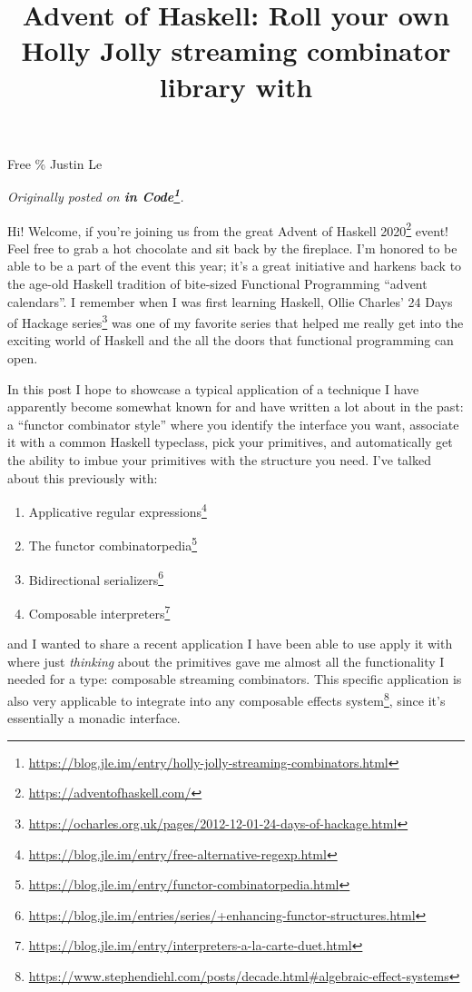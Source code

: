 \documentclass[]{article}
\title{Advent of Haskell: Roll your own Holly Jolly streaming combinator library with}
\renewcommand{\href}[2]{#2\footnote{\url{#1}}}
\begin{document}
\maketitle

Free \% Justin Le

\emph{Originally posted on
\textbf{\href{https://blog.jle.im/entry/holly-jolly-streaming-combinators.html}{in
Code}}.}

Hi! Welcome, if you're joining us from the great
\href{https://adventofhaskell.com/}{Advent of Haskell 2020} event! Feel free to
grab a hot chocolate and sit back by the fireplace. I'm honored to be able to be
a part of the event this year; it's a great initiative and harkens back to the
age-old Haskell tradition of bite-sized Functional Programming ``advent
calendars''. I remember when I was first learning Haskell,
\href{https://ocharles.org.uk/pages/2012-12-01-24-days-of-hackage.html}{Ollie
Charles' 24 Days of Hackage series} was one of my favorite series that helped me
really get into the exciting world of Haskell and the all the doors that
functional programming can open.

In this post I hope to showcase a typical application of a technique I have
apparently become somewhat known for and have written a lot about in the past: a
``functor combinator style'' where you identify the interface you want,
associate it with a common Haskell typeclass, pick your primitives, and
automatically get the ability to imbue your primitives with the structure you
need. I've talked about this previously with:

\begin{enumerate}
\def\labelenumi{\arabic{enumi}.}
\tightlist
\item
  \href{https://blog.jle.im/entry/free-alternative-regexp.html}{Applicative
  regular expressions}
\item
  \href{https://blog.jle.im/entry/functor-combinatorpedia.html}{The functor
  combinatorpedia}
\item
  \href{https://blog.jle.im/entries/series/+enhancing-functor-structures.html}{Bidirectional
  serializers}
\item
  \href{https://blog.jle.im/entry/interpreters-a-la-carte-duet.html}{Composable
  interpreters}
\end{enumerate}

and I wanted to share a recent application I have been able to use apply it with
where just \emph{thinking} about the primitives gave me almost all the
functionality I needed for a type: composable streaming combinators. This
specific application is also very applicable to integrate into any
\href{https://www.stephendiehl.com/posts/decade.html\#algebraic-effect-systems}{composable
effects system}, since it's essentially a monadic interface.
\end{document}
